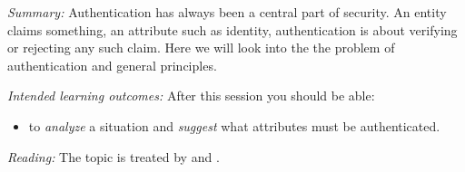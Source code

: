 \emph{Summary:}
Authentication has always been a central part of security.
An entity claims something, an attribute such as identity, authentication is 
about verifying or rejecting any such claim.
Here we will look into the the problem of authentication and general 
principles.

\emph{Intended learning outcomes:}
After this session you should be able:
\begin{itemize}
  \item to \emph{analyze} a situation and \emph{suggest} what attributes must 
    be authenticated.
\end{itemize}

\emph{Reading:}
The topic is treated by \textcite[Ch.~4]{Gollmann2011cs} and 
\textcite[Ch.~2]{Anderson2008sea}.

